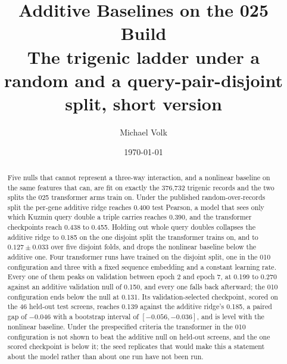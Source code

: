 \documentclass[10pt,a4paper]{article}
\title{\vspace{-1.5em}Additive Baselines on the 025 Build\\
  {\large The trigenic ladder under a random and a query-pair-disjoint split,
   short version}}
\author{Michael Volk}
\date{\today}
\begin{document}
\maketitle
\thispagestyle{empty}

\begin{abstract}
\noindent
Five nulls that cannot represent a three-way interaction, and a nonlinear baseline
on the same features that can, are fit on exactly the 376{,}732 trigenic records
and the two splits the 025 transformer arms train on. Under the published
random-over-records split the per-gene additive ridge reaches 0.400 test Pearson, a
model that sees only which Kuzmin query double a triple carries reaches 0.390, and
the transformer checkpoints reach 0.438 to 0.455. Holding out whole query doubles
collapses the additive ridge to 0.185 on the one disjoint split the transformer
trains on, and to $0.127 \pm 0.033$ over five disjoint folds, and drops the
nonlinear baseline below the additive one. Four transformer runs have trained on
the disjoint split, one in the 010 configuration and three with a fixed sequence
embedding and a constant learning rate. Every one of them peaks on validation
between epoch 2 and epoch 7, at 0.199 to 0.270 against an additive validation null
of 0.150, and every one falls back afterward; the 010 configuration ends below the
null at 0.131. Its validation-selected checkpoint, scored on the 46 held-out test
screens, reaches 0.139 against the additive ridge's 0.185, a paired gap of $-0.046$
with a bootstrap interval of $[-0.056, -0.036]$, and is level with the nonlinear
baseline. Under the prespecified criteria the transformer in the 010 configuration
is not shown to beat the additive null on held-out screens, and the one scored
checkpoint is below it; the seed replicates that would make this a statement about
the model rather than about one run have not been run.
\end{abstract}

\vspace{0.5em}
\tccontents
\clearpage







\end{document}

